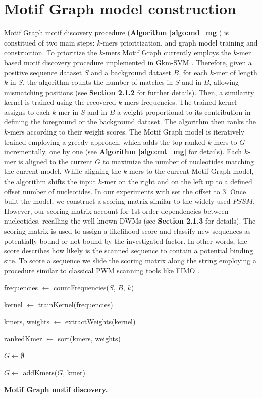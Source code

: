 \documentclass[a4paper, titlepage, 8pt, openright]{book}
\begin{document}
\section{Motif Graph model construction}
Motif Graph motif discovery procedure (\textbf{Algorithm \ref{algo:md_mg}}) is constitued of two main steps: $k$-mers prioritization, and graph model training and construction. To prioritize the $k$-mers Motif Graph currently employs the $k$-mer based motif discovery procedure implemented in Gkm-SVM \citep{ghandi2014enhanced}. Therefore, given a positive sequence dataset $S$ and a background dataset $B$, for each $k$-mer of length $k$ in $S$, the algorithm counts the number of matches in $S$ and in $B$, allowing mismatching positions (see \textbf{Section 2.1.2} for further details). Then, a similarity kernel is trained using the recovered $k$-mers frequencies. The trained kernel assigns to each $k$-mer in $S$ and in $B$ a weight proportional to its contribution in defining the foreground or the background dataset. The algorithm then ranks the $k$-mers according to their weight scores. The Motif Graph model is iteratively trained employing a greedy approach, which adds the top ranked $k$-mers to $G$ incrementally, one by one (see \textbf{Algorithm \ref{algo:mt_mg}} for details). Each $k$-mer is aligned to the current $G$ to maximize the number of nucleotides matching the current model. While aligning the $k$-mers to the current Motif Graph model, the algorithm shifts the input $k$-mer on the right and on the left up to a defined offset number of nucleotides. In our experiments with set the offset to $3$. Once built the model, we construct a scoring matrix similar to the widely used $PSSM$. However, our scoring matrix account for $1$st order dependencies between nucleotides, recalling the well-known DWMs (see \textbf{Section 2.1.3} for details). The scoring matrix is used to assign a likelihood score and classify new sequences as potentially bound or not bound by the investigated factor. In other words, the score describes how likely is the scanned sequence to contain a potential binding site. To score a sequence we slide the scoring matrix along the string employing a procedure similar to classical PWM scanning tools like FIMO \citep{grant2011fimo}.
\begin{algorithm}
	\DontPrintSemicolon

	frequencies $\gets$ countFrequencies($S$, $B$, $k$)

	kernel $\gets$ trainKernel(frequencies)

	kmers, weights $\gets$ extractWeights(kernel)

	rankedKmer $\gets$ sort(kmers, weights)

	$G \gets \emptyset$

	{
		$G \gets$ addKmers($G$, kmer)
	}

	\caption{\textbf{Motif Graph motif discovery.}}
	\label{algo:md_mg}
\end{algorithm}
\end{document}
